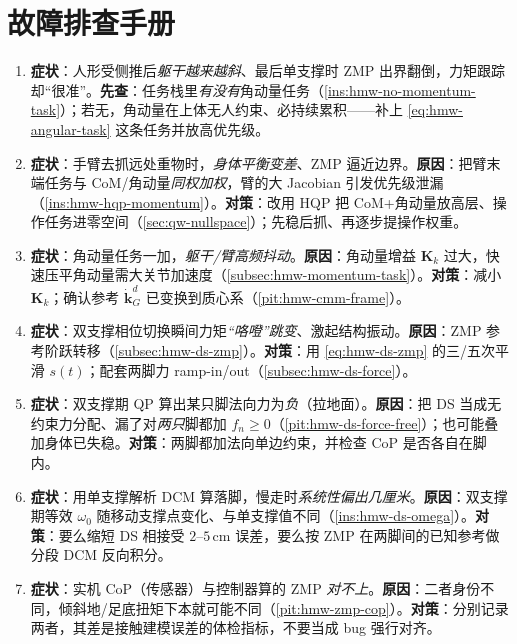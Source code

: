 \section*{故障排查手册}
\begin{enumerate}
  \item \textbf{症状}：人形受侧推后\emph{躯干越来越斜}、最后单支撑时 ZMP 出界翻倒，力矩跟踪却“很准”。\textbf{先查}：任务栈里\emph{有没有}角动量任务（\cref{ins:hmw-no-momentum-task}）；若无，角动量在上体无人约束、必持续累积——补上 \cref{eq:hmw-angular-task} 这条任务并放高优先级。
  \item \textbf{症状}：手臂去抓远处重物时，\emph{身体平衡变差}、ZMP 逼近边界。\textbf{原因}：把臂末端任务与 CoM/角动量\emph{同权加权}，臂的大 Jacobian 引发优先级泄漏（\cref{ins:hmw-hqp-momentum}）。\textbf{对策}：改用 HQP 把 CoM+角动量放高层、操作任务进零空间（\cref{sec:qw-nullspace}）；先稳后抓、再逐步提操作权重。
  \item \textbf{症状}：角动量任务一加，\emph{躯干/臂高频抖动}。\textbf{原因}：角动量增益 $\mathbf K_k$ 过大，快速压平角动量需大关节加速度（\cref{subsec:hmw-momentum-task}）。\textbf{对策}：减小 $\mathbf K_k$；确认参考 $\dot{\mathbf k}_G^d$ 已变换到质心系（\cref{pit:hmw-cmm-frame}）。
  \item \textbf{症状}：双支撑相位切换瞬间力矩\emph{“咯噔”跳变}、激起结构振动。\textbf{原因}：ZMP 参考阶跃转移（\cref{subsec:hmw-ds-zmp}）。\textbf{对策}：用 \cref{eq:hmw-ds-zmp} 的三/五次平滑 $s(t)$；配套两脚力 ramp-in/out（\cref{subsec:hmw-ds-force}）。
  \item \textbf{症状}：双支撑期 QP 算出某只脚法向力为\emph{负}（拉地面）。\textbf{原因}：把 DS 当成无约束力分配、漏了对\emph{两只}脚都加 $f_n\ge 0$（\cref{pit:hmw-ds-force-free}）；也可能叠加身体已失稳。\textbf{对策}：两脚都加法向单边约束，并检查 CoP 是否各自在脚内。
  \item \textbf{症状}：用单支撑解析 DCM 算落脚，慢走时\emph{系统性偏出几厘米}。\textbf{原因}：双支撑期等效 $\omega_0$ 随移动支撑点变化、与单支撑值不同（\cref{ins:hmw-ds-omega}）。\textbf{对策}：要么缩短 DS 相接受 $2$–$5\,\mathrm{cm}$ 误差，要么按 ZMP 在两脚间的已知参考做分段 DCM 反向积分。
  \item \textbf{症状}：实机 CoP（传感器）与控制器算的 ZMP \emph{对不上}。\textbf{原因}：二者身份不同，倾斜地/足底扭矩下本就可能不同（\cref{pit:hmw-zmp-cop}）。\textbf{对策}：分别记录两者，其差是接触建模误差的体检指标，不要当成 bug 强行对齐。
\end{enumerate}
